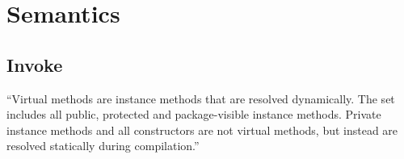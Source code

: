 \chapter{Semantics}\label{chap:semantics}
%
%
%




\section{Invoke}
``Virtual methods are instance methods that are resolved dynamically. The set includes all public, protected and package-visible instance methods. Private instance methods and all constructors are not virtual methods, but instead are resolved statically during compilation.'' \cite[cap. 4.3.7.6]{java_card_specc}